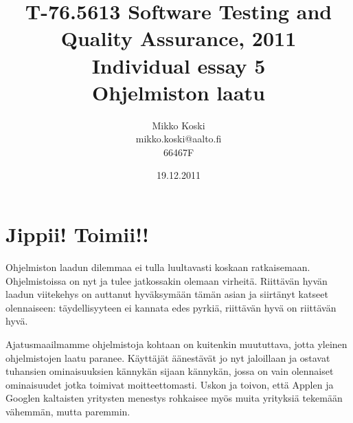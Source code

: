 \documentclass[a4paper]{article}
\begin{document}
\title{\small T-76.5613 Software Testing and Quality Assurance, 2011 \\ Individual essay 5 \\ \huge Ohjelmiston laatu}
\date{19.12.2011}
\author{Mikko Koski \\ mikko.koski@aalto.fi \\ 66467F}
\maketitle

\large

\section{Jippii! Toimii!!}

Ohjelmiston laadun dilemmaa ei tulla luultavasti koskaan ratkaisemaan. Ohjelmistoissa on nyt ja tulee jatkossakin olemaan virheitä. Riittävän hyvän laadun viitekehys on auttanut hyväksymään tämän asian ja siirtänyt katseet olennaiseen: täydellisyyteen ei kannata edes pyrkiä, riittävän hyvä on riittävän hyvä. 

Ajatusmaailmamme ohjelmistoja kohtaan on kuitenkin muututtava, jotta yleinen ohjelmistojen laatu paranee. Käyttäjät äänestävät jo nyt jaloillaan ja ostavat tuhansien ominaisuuksien kännykän sijaan kännykän, jossa on vain olennaiset ominaisuudet jotka toimivat moitteettomasti. Uskon ja toivon, että Applen ja Googlen kaltaisten yritysten menestys rohkaisee myös muita yrityksiä tekemään vähemmän, mutta paremmin.
\end{document}
